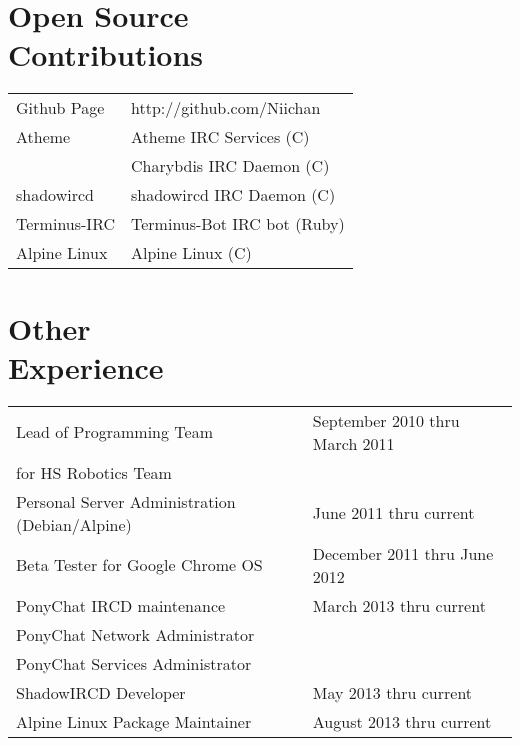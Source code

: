 \documentclass[line, margin]{res}
\begin{document}
\address{12924 SE 26th ST \\ Bellevue WA, 98005 \\ +1 (425) 221-7761}
     
\begin{resume}

\section{Open Source \\ Contributions}
\begin{tabular}{l l}
 Github Page & \hfill http://github.com/Niichan \\ [5pt]
 Atheme & \hfill Atheme IRC Services (C) \\ 
 & \hfill Charybdis IRC Daemon (C) \\ [5pt]
 shadowircd & \hfill shadowircd IRC Daemon (C) \\ [5pt]
 Terminus-IRC & \hfill Terminus-Bot IRC bot (Ruby) \\ [5pt]
 Alpine Linux & \hfill Alpine Linux (C) \\
\end{tabular}

\section{Other \\ Experience}
\begin{tabular}{l l}
 Lead of Programming Team & \hfill September 2010 thru March 2011 \\ 
 for HS Robotics Team & \\ [6pt]
 Personal Server Administration (Debian/Alpine) & \hfill June 2011 thru current  \\ [6pt]
 Beta Tester for Google Chrome OS & \hfill December 2011 thru June 2012 \\ [6pt]
 PonyChat IRCD maintenance & \hfill March 2013 thru current \\ 
 PonyChat Network Administrator & \hfill \\ 
 PonyChat Services Administrator & \hfill \\ [6pt]
 ShadowIRCD Developer & \hfill May 2013 thru current \\ [6pt]
 Alpine Linux Package Maintainer & \hfill August 2013 thru current \\ 
\end{tabular}
   

\end{resume}
\end{document}
